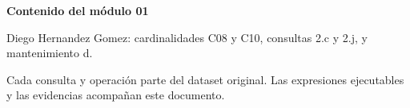 \documentclass[11pt,letterpaper]{article}
\begin{document}

\tableofcontents
\vspace{1cm}
\textbf{Contenido del módulo 01}\par
Diego Hernandez Gomez: cardinalidades C08 y C10, consultas 2.c y 2.j, y mantenimiento d.

Cada consulta y operación parte del dataset original. Las expresiones ejecutables y las evidencias acompañan este documento.
\clearpage

\clearpage

\clearpage

\clearpage

\end{document}
